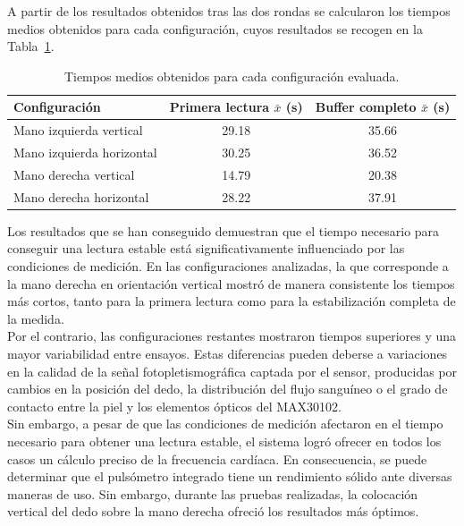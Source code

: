 A partir de los resultados obtenidos tras las dos rondas se calcularon los tiempos medios obtenidos para cada configuración, cuyos resultados se recogen en la Tabla~\ref{tab:condiciones_medida}.

\begin{table}[H]
\centering
\caption{Tiempos medios obtenidos para cada configuración evaluada.}
\label{tab:condiciones_medida}
\begin{tabular}{|l|c|c|}
\hline
\textbf{Configuración} & \textbf{Primera lectura $\bar{x}$ (s)} & \textbf{Buffer completo $\bar{x}$ (s)} \\ \hline
Mano izquierda vertical & 29.18 & 35.66 \\ \hline
Mano izquierda horizontal & 30.25 & 36.52 \\ \hline
Mano derecha vertical & 14.79 & 20.38 \\ \hline
Mano derecha horizontal & 28.22 & 37.91 \\ \hline
\end{tabular}
\end{table}

Los resultados que se han conseguido demuestran que el tiempo necesario para conseguir una lectura estable está significativamente influenciado por las condiciones de medición. En las configuraciones analizadas, la que corresponde a la mano derecha en orientación vertical mostró de manera consistente los tiempos más cortos, tanto para la primera lectura como para la estabilización completa de la medida.\\

Por el contrario, las configuraciones restantes mostraron tiempos superiores y una mayor variabilidad entre ensayos. Estas diferencias pueden deberse a variaciones en la calidad de la señal fotopletismográfica captada por el sensor, producidas por cambios en la posición del dedo, la distribución del flujo sanguíneo o el grado de contacto entre la piel y los elementos ópticos del MAX30102.\\

Sin embargo, a pesar de que las condiciones de medición afectaron en el tiempo necesario para obtener una lectura estable, el sistema logró ofrecer en todos los casos un cálculo preciso de la frecuencia cardíaca. En consecuencia, se puede determinar que el pulsómetro integrado tiene un rendimiento sólido ante diversas maneras de uso. Sin embargo, durante las pruebas realizadas, la colocación vertical del dedo sobre la mano derecha ofreció los resultados más óptimos.


